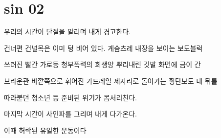 \hypertarget{sin-02}{%

\section{sin 02}\label{sin-02}}



우리의 시간이 단절을 알리며 내게 경고한다.



건너편 건널목은 이미 텅 비어 있다. 게슴츠레 내장을 보이는 보도블럭

쓰러진 빨간 가로등 청부폭력의 희생양 뿌리내린 깃발 화면에 금이 간

브라운관 바깥쪽으로 휘어진 가드레일 제자리로 돌아가는 횡단보도 내 뒤를

따라붙던 청소년 등 준비된 위기가 몸서리친다.



마지막 시간이 사인파를 그리며 내게 다가온다.



이때 허락된 유일한 운동이다

